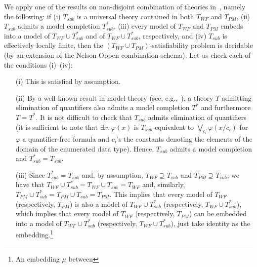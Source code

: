\documentclass[conference]{IEEEtran}
\begin{document}
\begin{LONG}
\begin{IEEEproof}
  We apply one of the results on non-disjoint combination of theories
  in~\cite{ghilardi-jar}, namely the following: if (i) $T_\mathit{sub}$ is a
  universal theory contained in both $T_\mathit{WF}$ and
  $T_\mathit{PM}$, (ii) $T_\mathit{sub}$ admits a model completion
  $T_\mathit{sub}^*$, (iii) every model of $T_\mathit{WF}$ and
  $T_\mathit{PM}$ embeds into a model of $T_\mathit{WF}\cup T_\mathit{sub}^*$
  and of $T_\mathit{WF}\cup T_\mathit{sub}^*$, respectively, and (iv)
  $T_\mathit{sub}$ is effectively locally finite, then the
  $(T_\mathit{WF}\cup T_\mathit{PM})$-satisfiability problem is
  decidable (by an extension of the Nelson-Oppen combination schema).
  Let us check each of the conditions (i)--(iv):
  \begin{itemize}
    \item[(i)] This is satisfied by assumption.
    \item[(ii)] By a well-known result in model-theory (see,
      e.g.,~\cite{chang-kiesler}), a theory $T$ admitting elimination
      of quantifiers also admits a model completion $T^*$ and
      furthermore $T=T^*$.  It is not difficult to check that
      $T_\mathit{sub}$ admits elimination of quantifiers (it is sufficient to
      note that $\exists x.\, \varphi(x)$ is $T_\mathit{sub}$-equivalent to
      $\bigvee_{c_i} \varphi(x/c_i)$ for $\varphi$ a quantifier-free
      formula and $c_i$'s the constants denoting the elements of the
      domain of the enumerated data type).  Hence, $T_\mathit{sub}$ admits a
      model completion and $T_\mathit{sub}^*=T_\mathit{sub}$.
    \item[(iii)] Since $T_\mathit{sub}^*=T_\mathit{sub}$ and, by assumption,
      $T_\mathit{WF}\supseteq T_\mathit{sub}$ and $T_\mathit{PM}\supseteq T_\mathit{sub}$, we have
      that $T_\mathit{WF}\cup T_\mathit{sub}^*=T_\mathit{WF}\cup T_\mathit{sub}=T_\mathit{WF}$ and,
      similarly, $T_\mathit{PM}\cup T_\mathit{sub}^*=T_\mathit{PM}\cup T_\mathit{sub}=T_\mathit{PM}$.
      This implies that every model of $T_\mathit{WF}$ (respectively, $T_\mathit{PM}$) is also a
      model of $T_\mathit{WF}\cup T_\mathit{sub}^*$ (respectively, $T_\mathit{WF}\cup T_\mathit{sub}^*$),
      which implies that every model of $T_\mathit{WF}$
      (respectively, $T_\mathit{PM}$) can be embedded into a model of $T_\mathit{WF}\cup
      T_\mathit{sub}^*$ (respectively, $T_\mathit{WF}\cup T_\mathit{sub}^*$), just take
      identity as the embedding.\footnote{An embedding $\mu$ between
}
\end{itemize}
\end{IEEEproof}
\end{LONG}
\end{document}

